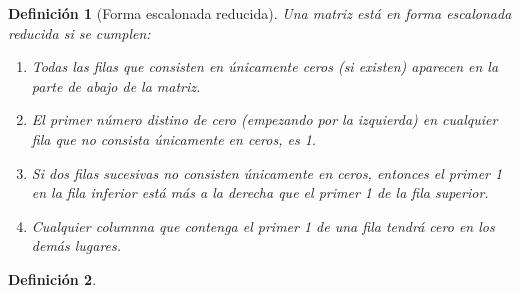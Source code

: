 \documentclass[12pt,a4paper]{extarticle}
\newtheorem{mydef}{Definici\'on}[section]
\begin{document}

\begin{mydef}[Forma escalonada reducida]
Una matriz est\'a en forma escalonada reducida si se cumplen:
\begin{enumerate}
\item Todas las filas que consisten en \'unicamente ceros (si existen)
  aparecen en la parte de abajo de la matriz.
\item El primer n\'umero distino de cero (empezando por la izquierda)
  en cualquier fila que no consista \'unicamente en ceros, es 1.
\item Si dos filas sucesivas no consisten \'unicamente en ceros,
  entonces el primer 1 en la fila inferior est\'a m\'as a la derecha
  que el primer 1 de la fila superior.
\item Cualquier columnna que contenga el primer 1 de una fila tendr\'a
  cero en los dem\'as lugares.
\end{enumerate}
\end{mydef}

\begin{mydef}
\end{mydef}
\end{document}

